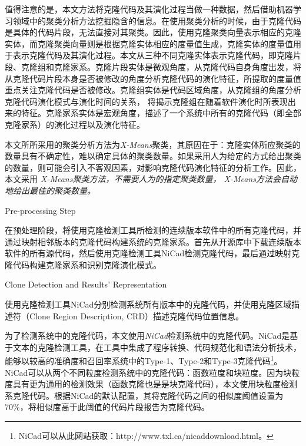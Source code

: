 值得注意的是，本文方法将克隆代码及其演化过程当做一种数据，然后借助机器学习领域中的聚类分析方法挖掘隐含的信息。在使用聚类分析的时候，由于克隆代码是具体的代码片段，无法直接对其聚类。因此，使用克隆聚类向量表示相应的克隆实体，而克隆聚类向量则是根据克隆实体相应的度量值生成，克隆实体的度量值用于表示克隆代码及其演化过程。本文从三种不同克隆实体表示克隆代码，即克隆片段、克隆组和克隆家系。克隆片段实体是微观角度，从克隆代码自身角度出发，将从克隆代码片段本身是否被修改的角度分析克隆代码的演化特征，所提取的度量值重点关注克隆代码是否被修改。克隆组实体是代码区域角度，从克隆组的角度分析克隆代码演化模式与演化时间的关系， 将揭示克隆组在随着软件演化时所表现出来的特征。克隆家系实体是宏观角度，描述了一个系统中所有的克隆代码（即全部克隆家系）的演化过程以及演化特征。

本文所所采用的聚类分析方法为{\em X-Means}\cite{pelleg2000x}聚类，其原因在于：克隆实体所应聚类的数量具有不确定性，难以确定具体的聚类数量。如果采用人为给定的方式给出聚类的数量，则可能会引入不客观因素，对影响克隆代码演化特征的分析工作。因此，本文采用\em{ X-Means}聚类方法，不需要人为的指定聚类数量，\em{ X-Means}方法会自动地给出最佳的聚类数量。

{ Pre-processing Step}

在预处理阶段，将使用克隆检测工具所检测的连续版本软件中的所有克隆代码，并通过映射相邻版本的克隆代码构建系统的克隆家系。首先从开源库中下载连续版本软件的所有源代码，然后使用克隆检测工具NiCad检测克隆代码，最后通过映射克隆代码构建克隆家系和识别克隆演化模式。

{Clone Detection and Results’ Representation}

使用克隆检测工具NiCad分别检测系统所有版本中的克隆代码，并使用克隆区域描述符（Clone Region Description, CRD）描述克隆代码位置信息。

为了检测系统中的克隆代码，本文使用{\em NiCad}\cite{roy2008nicad}检测系统中的克隆代码。NiCad是基于文本的克隆检测工具，在工具中集成了程序转换、代码规范化和语法分析技术\cite{cordy2006txl}\cite{dean2003agile}，能够以较高的准确度和召回率系统中的Type-1、Type-2和Type-3克隆代码\footnote{NiCad可以从此网站获取：http://www.txl.ca/nicaddownload.html。}。NiCad可以从两个不同粒度检测系统中的克隆代码：函数粒度和块粒度。因为块粒度具有更为通用的检测效果（函数克隆也是是块克隆代码），本文使用{块粒度}检测系克隆代码。根据NiCad的默认配置，其将克隆代码之间的相似度阈值设置为70\%，将相似度高于此阈值的代码片段报告为克隆代码。

